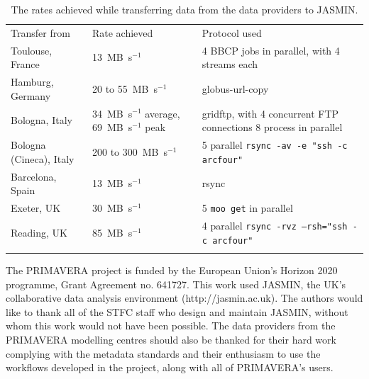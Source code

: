 \documentclass[gmd, manuscript]{copernicus}
\begin{document}
\appendixtables   %

\begin{table}[t]
	\caption{The rates achieved while transferring data from the data providers to JASMIN.}
	\begin{tabular}{lll}
		\tophline
		Transfer from & Rate achieved & Protocol used \\
		\middlehline
		Toulouse, France & 13~MB~s$^{-1}$ & 4 BBCP jobs in parallel, with 4 streams each \\
		Hamburg, Germany & 20 to 55~MB~s$^{-1}$ & globus-url-copy \\
		Bologna, Italy & 34~MB~s$^{-1}$ average, 69~MB~s$^{-1}$ peak & gridftp, with 4 concurrent FTP connections 8 process in parallel \\
		Bologna (Cineca), Italy & 200 to 300~MB~s$^{-1}$ & 5 parallel \texttt{rsync -av -e "ssh -c arcfour"} \\
		Barcelona, Spain & 13~MB~s$^{-1}$ & rsync \\
		Exeter, UK & 30~MB~s$^{-1}$ & 5 \texttt{moo get} in parallel \\
		Reading, UK & 85~MB~s$^{-1}$ & 4 parallel \texttt{rsync -rvz --rsh="ssh -c arcfour"} \\
		\bottomhline
	\end{tabular}
	\belowtable{} %
	\label{rates_achieved}
\end{table}








\begin{acknowledgements}
The PRIMAVERA project is funded by the European Union's Horizon 2020 programme, Grant Agreement no. 641727. This work used JASMIN, the UK's collaborative data analysis environment (http://jasmin.ac.uk). The authors would like to thank all of the STFC staff who design and maintain JASMIN, without whom this work would not have been possible. The data providers from the PRIMAVERA modelling centres should also be thanked for their hard work complying with the metadata standards and their enthusiasm to use the workflows developed in the project, along with all of PRIMAVERA's users.
\end{acknowledgements}
\end{document}
